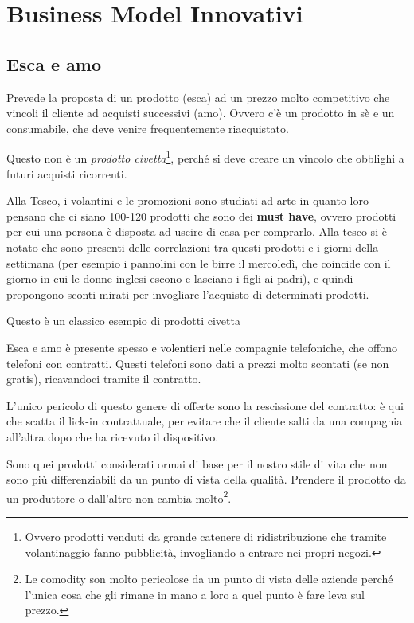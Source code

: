 \chapter{Business Model Innovativi}

\section{Esca e amo}

Prevede la proposta di un prodotto (esca) ad un prezzo molto competitivo che
vincoli il cliente ad acquisti successivi (amo). Ovvero c'è un prodotto in sè e
un consumabile, che deve venire frequentemente riacquistato.

Questo non è un \textit{prodotto civetta}\footnote{Ovvero prodotti venduti da
grande catenere di ridistribuzione che tramite volantinaggio fanno pubblicità,
invogliando a entrare nei propri negozi.}, perché si deve creare un vincolo che
obblighi a futuri acquisti ricorrenti.

\begin{example}[Tesco]
Alla Tesco, i volantini e le promozioni sono studiati ad arte in quanto loro
pensano che ci siano 100-120 prodotti che sono dei \textbf{must have}, ovvero
prodotti per cui una persona è disposta ad uscire di casa per comprarlo. Alla
tesco si è notato che sono presenti delle correlazioni tra questi prodotti e i
giorni della settimana (per esempio i pannolini con le birre il mercoledì, che
coincide con il giorno in cui le donne inglesi escono e lasciano i figli ai
padri), e quindi propongono sconti mirati per invogliare l'acquisto di
determinati prodotti.

Questo è un classico esempio di prodotti civetta
\end{example}

Esca e amo è presente spesso e volentieri nelle compagnie telefoniche, che
offono telefoni con contratti. Questi telefoni sono dati a prezzi molto
scontati (se non gratis), ricavandoci tramite il contratto.


L'unico pericolo di questo genere di offerte sono la rescissione del contratto:
è qui che scatta il lick-in contrattuale, per evitare che il cliente salti da
una compagnia all'altra dopo che ha ricevuto il dispositivo.

\begin{definition}[Comodity]
Sono quei prodotti considerati ormai di base per il nostro stile di vita che
non sono più differenziabili da un punto di vista della qualità. Prendere il
prodotto da un produttore o dall'altro non cambia molto\footnote{Le comodity
son molto pericolose da un punto di vista delle aziende perché l'unica cosa che
gli rimane in mano a loro a quel punto è fare leva sul prezzo.}.
\end{definition}


